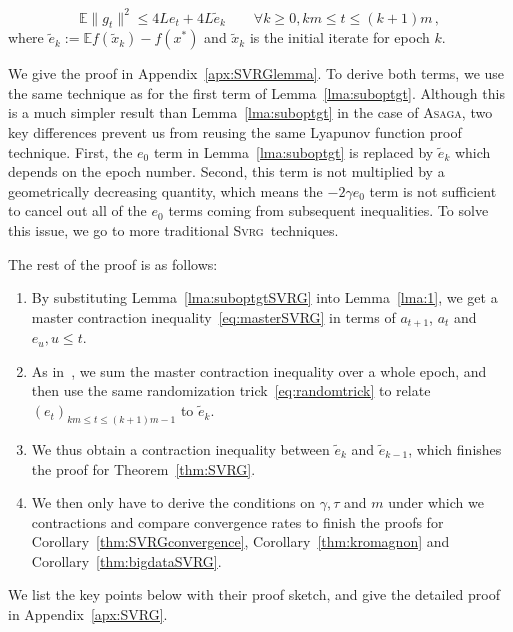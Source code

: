 \documentclass[twoside, 11pt]{article}
\newcommand{\stepsize}{\gamma}
\newcommand{\overlap}{\tau}
\newcommand{\lipschitz}{L}
\newcommand{\E}{\mathbb{E}}
\newcommand{\ASAGA}{\textsc{Asaga}}
\newcommand{\SVRG}{\textsc{Svrg}}
\begin{document}
\begin{lemma} [Suboptimality bound on $\E \|g_t\|^2$]\label{lma:suboptgtSVRG}
	\begin{equation}\label{gtboundsvrg}
		\E\|g_t\|^2
		\leq 4\lipschitz e_t
		+ 4\lipschitz \tilde e_k
		\qquad \forall k \geq 0, km\leq t \leq (k+1)m\, ,
	\end{equation}
	where $\tilde e_k :=  \E f(\tilde x_k) - f(x^*)$ and $\tilde x_k$ is the initial iterate for epoch $k$.
\end{lemma}
We give the proof in Appendix~\ref{apx:SVRGlemma}. To derive both terms, we use the same technique as for the first term of Lemma~\ref{lma:suboptgt}.
Although this is a much simpler result than Lemma~\ref{lma:suboptgt} in the case of \ASAGA, two key differences prevent us from reusing the same Lyapunov function proof technique.
First, the $e_0$ term in Lemma~\ref{lma:suboptgt} is replaced by $\tilde e_k$ which depends on the epoch number.
Second, this term is not multiplied by a geometrically decreasing quantity, which means the $-2\stepsize e_0$ term is not sufficient to cancel out all of the $e_0$ terms coming from subsequent inequalities.
To solve this issue, we go to more traditional \SVRG\ techniques.

The rest of the proof is as follows:
\begin{enumerate}
	\item By substituting Lemma~\ref{lma:suboptgtSVRG} into Lemma~\ref{lma:1}, we get a master contraction inequality~\eqref{eq:masterSVRG} in terms of $a_{t+1}$, $a_t$ and $e_u, u\leq t$.
	\item As in~\citet{svrg}, we sum the master contraction inequality over a whole epoch, and then use the same randomization trick~\eqref{eq:randomtrick} to relate $(e_t)_{km \leq t \leq(k+1)m -1}$ to $\tilde e_k$.
	\item We thus obtain a contraction inequality between $\tilde e_k$ and $\tilde e_{k-1}$, which finishes the proof for Theorem~\ref{thm:SVRG}.
	\item We then only have to derive the conditions on $\stepsize, \overlap$ and $m$ under which we contractions and compare convergence rates to finish the proofs for Corollary~\ref{thm:SVRGconvergence}, Corollary~\ref{thm:kromagnon} and Corollary~\ref{thm:bigdataSVRG}.
\end{enumerate}

We list the key points below with their proof sketch, and give the detailed proof in Appendix~\ref{apx:SVRG}.
\end{document}
